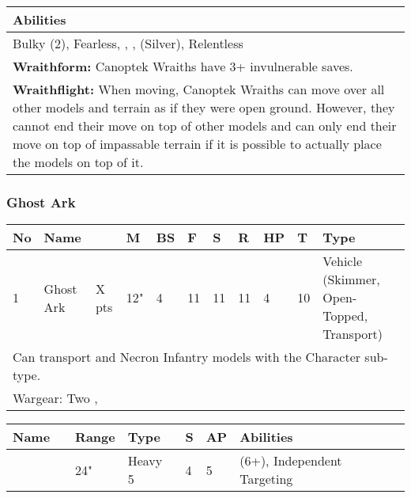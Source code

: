 \noindent
\begin{tabular}{||m{532pt}||}
	\hline
	Abilities \\
	\hline
	Bulky (2), Fearless, \quickref{Living Metal}, \quickref{Reanimation Protocols}, \quickref{Soulless Hordes} (Silver), Relentless \\
	\textbf{Wraithform:} Canoptek Wraiths have 3+ invulnerable saves. \\
	\textbf{Wraithflight:} When moving, Canoptek Wraiths can move over all other models and terrain as if they were open ground. However, they cannot end their move on top of other models and can only end their move on top of impassable terrain if it is possible to actually place the models on top of it. \\
	\hline
\end{tabular}


\newpage
\subsubsection{Ghost Ark}

\noindent
\begin{tabular}{||m{10pt} m{95pt} m{30pt} m{11pt} m{11pt} m{11pt} m{11pt} m{11pt} m{11pt} m{11pt} m{200pt}||}
	\hline
	No & Name & & M & BS & F & S & R & HP & T & Type \\
	\hline
	1 & Ghost Ark & X pts & 12" & 4 & 11 & 11 & 11 & 4 & 10 & Vehicle (Skimmer, Open-Topped, Transport) \\
	\hline
	\hline
	\multicolumn{11}{||Z{532 pt}||}{Can transport \quickref{Dynastic Warriors} and Necron Infantry models with the Character sub-type.}\\		
	\hline
	\hline
	\multicolumn{11}{||Z{532 pt}||}{Wargear: Two \quickref{Gauss Flayer Arrays}, \quickref{Quantum Shielding}}\\
	\hline
\end{tabular}

\noindent
\begin{tabular}{||m{110pt} m{30pt} m{31pt} m{55pt} m{12pt} m{12pt} m{210pt}||}
	\hline
	Name & & Range & Type & S & AP & Abilities \\
	\hline
	\quickref{Gauss Flayer Arrays} & & 24" & Heavy 5 & 4 & 5 & \quickref{Gauss} (6+), Independent Targeting \\
	\hline
\end{tabular}


